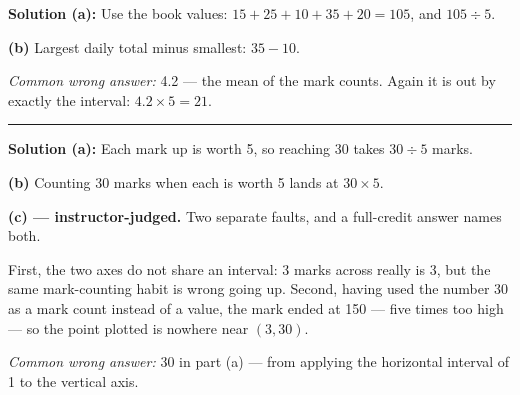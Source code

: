\documentclass[12pt]{article}
\begin{document}

\textbf{Solution (a):} Use the book values: $15 + 25 + 10 + 35 + 20 = 105$, and $105 \div 5$. 

\textbf{(b)} Largest daily total minus smallest: $35 - 10$. 

\emph{Common wrong answer:} 4.2 --- the mean of the mark counts. Again it is out by exactly the interval: $4.2 \times 5 = 21$.

\vspace{0.15cm}\noindent\rule{\linewidth}{0.2pt}\vspace{0.15cm}


\textbf{Solution (a):} Each mark up is worth 5, so reaching 30 takes $30 \div 5$ marks. 

\textbf{(b)} Counting 30 marks when each is worth 5 lands at $30 \times 5$. 

\textbf{(c) --- instructor-judged.} Two separate faults, and a full-credit answer names both.

First, the two axes do not share an interval: 3 marks across really is 3, but the same mark-counting habit is wrong going up. Second, having used the number 30 as a mark count instead of a value, the mark ended at 150 --- five times too high --- so the point plotted is nowhere near $(3, 30)$.

\emph{Common wrong answer:} 30 in part (a) --- from applying the horizontal interval of 1 to the vertical axis.
\end{document}

